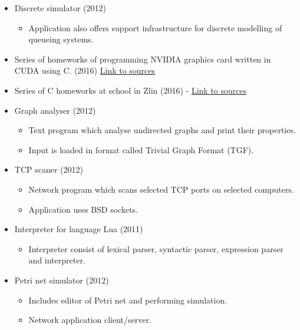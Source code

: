 \documentclass[11pt,a4paper,sans]{moderncv}        %
\begin{document}
{
\begin{itemize}
	\item Discrete simulator (2012)
	\begin{itemize}
		\item Application also offers support infrastructure for discrete modelling of queueing systems.
	\end{itemize}
\end{itemize}
}
{
	\begin{itemize}
		\item Series of homeworks of programming NVIDIA graphics card written in CUDA using C. (2016) \href{https://github.com/navrkald/Zlin_NVIDIA_programming_homeworks}{Link to sources}
		\item Series of C homeworks at school in Zlin (2016) - \href{https://github.com/navrkald/Zlin-C-programming-homeworks}{Link to sources} 
		\item Graph analyser (2012)
		\begin{itemize}
			\item Text program which analyse undirected graphs and print their properties.
			\item Input is loaded in format called Trivial Graph Format (TGF).
		\end{itemize}
		\item TCP scaner (2012)
		\begin{itemize}
			\item Network program which scans selected TCP ports on selected computers.
			\item Application uses BSD sockets.
		\end{itemize}	
		\item Interpreter for language Lua (2011)
		\begin{itemize}
			\item Interpreter consist of lexical parser, syntactic parser, expression parser and interpreter.
		\end{itemize}
	\end{itemize}
}
{
\begin{itemize}
	\item Petri net simulator (2012)	
	\begin{itemize}
		\item Includes editor of Petri net and performing simulation.
		\item Network application client/server.
	\end{itemize}
\end{itemize}
}
\end{document}

